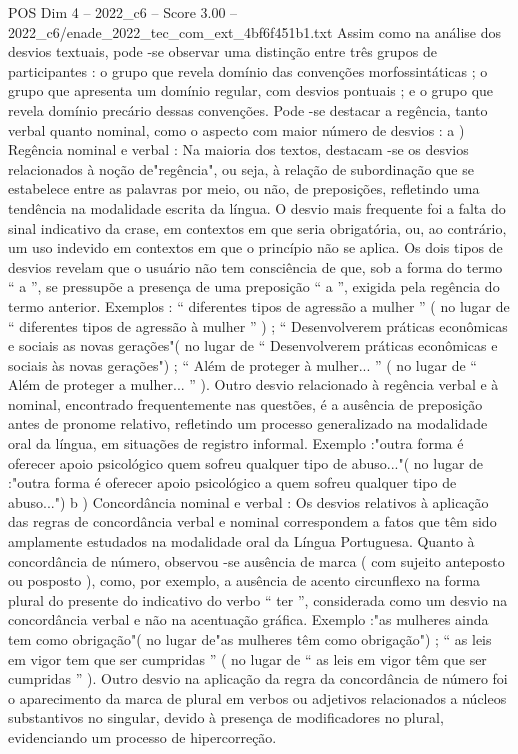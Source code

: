 \begin{textsample}{POS Dim 4 – 2022\_c6 – Score 3.00 – 2022\_c6/enade\_2022\_tec\_com\_ext\_4bf6f451b1.txt}
Assim como na análise dos desvios textuais, pode -se observar uma distinção entre três grupos de participantes : o grupo que revela domínio das convenções morfossintáticas ; o grupo que apresenta um domínio regular, com desvios pontuais ; e o grupo que revela domínio precário dessas convenções.
Pode -se destacar a regência, tanto verbal quanto nominal, como o aspecto com maior número de desvios : a ) Regência nominal e verbal : Na maioria dos textos, destacam -se os desvios relacionados à noção de"regência", ou seja, à relação de subordinação que se estabelece entre as palavras por meio, ou não, de preposições, refletindo uma tendência na modalidade escrita da língua.
O desvio mais frequente foi a falta do sinal indicativo da crase, em contextos em que seria obrigatória, ou, ao contrário, um uso indevido em contextos em que o princípio não se aplica.
Os dois tipos de desvios revelam que o usuário não tem consciência de que, sob a forma do termo “ a ”, se pressupõe a presença de uma preposição “ a ”, exigida pela regência do termo anterior.
Exemplos : “ diferentes tipos de agressão a mulher ” ( no lugar de “ diferentes tipos de agressão à mulher ” ) ; “ Desenvolverem práticas econômicas e sociais as novas gerações"( no lugar de “ Desenvolverem práticas econômicas e sociais às novas gerações") ; “ Além de proteger à mulher... ” ( no lugar de “ Além de proteger a mulher... ” ).
Outro desvio relacionado à regência verbal e à nominal, encontrado frequentemente nas questões, é a ausência de preposição antes de pronome relativo, refletindo um processo generalizado na modalidade oral da língua, em situações de registro informal.
Exemplo :"outra forma é oferecer apoio psicológico quem sofreu qualquer tipo de abuso..."( no lugar de :"outra forma é oferecer apoio psicológico a quem sofreu qualquer tipo de abuso...") b ) Concordância nominal e verbal : Os desvios relativos à aplicação das regras de concordância verbal e nominal correspondem a fatos que têm sido amplamente estudados na modalidade oral da Língua Portuguesa.
Quanto à concordância de número, observou -se ausência de marca ( com sujeito anteposto ou posposto ), como, por exemplo, a ausência de acento circunflexo na forma plural do presente do indicativo do verbo “ ter ”, considerada como um desvio na concordância verbal e não na acentuação gráfica.
Exemplo :"as mulheres ainda tem como obrigação"( no lugar de"as mulheres têm como obrigação") ; “ as leis em vigor tem que ser cumpridas ” ( no lugar de “ as leis em vigor têm que ser cumpridas ” ).
Outro desvio na aplicação da regra da concordância de número foi o aparecimento da marca de plural em verbos ou adjetivos relacionados a núcleos substantivos no singular, devido à presença de modificadores no plural, evidenciando um processo de hipercorreção.

\end{textsample}
